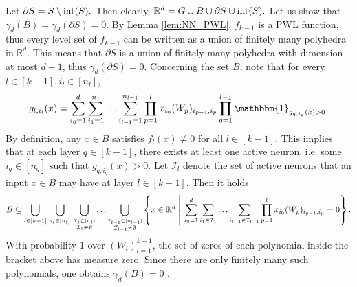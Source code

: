 \documentclass[11pt]{article}
\makeatletter
\def\RR{\mathbb{R}}
\def\Set#1{\left\{ #1 \right\}}
\def\Bigbar#1{\mathrel{\left|\vphantom{#1}\right.}}%
\def\Setbar#1#2{\Set{#1 \Bigbar{#1 #2} #2}}
\def\interior{\mathop{\rm int}\nolimits}
\makeatother
\begin{document}
    Let $\partial S=S\setminus\interior(S).$ 
    Then clearly, $\RR^d=G\cup B\cup\partial S\cup\interior(S).$
    Let us show that $\gamma_d(B)=\gamma_d(\partial S)=0.$
    By Lemma \ref{lem:NN_PWL}, $f_{k-1}$ is a PWL function,
    thus every level set of $f_{k-1}$ can be written as a union of finitely many polyhedra in $\RR^d.$
    This means that $\partial S$ is a union of finitely many polyhedra with dimension at most $d-1$, thus $\gamma_d(\partial S)=0.$
    Concerning the set $B$, note that for every $l\in[k-1], i_l\in[n_l]$,
    \begin{align*}
	g_{l,i_l}(x)
	=\sum_{i_0=1}^{d} \sum_{i_1=1}^{n_1}\ldots\sum_{i_{l-1}=1}^{n_{l-1}} \prod_{p=1}^{l} x_{i_0} (W_p)_{i_{p-1},i_p} \prod_{q=1}^{l-1} \mathbbm{1}_{g_{q,i_q}(x)>0} .
    \end{align*}
    By definition, any $x\in B$ satisfies $f_l(x)\neq 0$ for all $l\in[k-1]$.
    This implies that at each layer $q\in[k-1]$, there exists at least one active neuron, i.e. some $i_q\in[n_q]$ such that $g_{q,i_q}(x)>0$.
    Let $\mathcal{I}_l$ denote the set of active neurons that an input $x\in B$ may have at layer $l\in[k-1].$
    Then it holds
    \begin{align*}
	B\subseteq
	\bigcup_{l\in[k-1]}\;
	\bigcup_{i_l\in[n_l]}\;
	\bigcup_{\stackrel{\mathcal{I}_1\subseteq [n_1]}{\mathcal{I}_1\neq\emptyset}}
	\ldots
	\bigcup_{\stackrel{\mathcal{I}_{l-1}\subseteq [n_{l-1}]}{\mathcal{I}_{l-1}\neq\emptyset}}
	\Setbar{x\in\RR^d}{\sum_{i_0=1}^{d} \sum_{i_1\in\mathcal{I}_1}\ldots\sum_{i_{l-1}\in\mathcal{I}_{l-1}} \prod_{p=1}^{l} x_{i_0} (W_p)_{i_{p-1},i_p} = 0} .
    \end{align*}
    With probability 1 over $(W_l)_{l=1}^{k-1}$, the set of zeros of each polynomial inside the bracket above has measure zero.
    Since there are only finitely many such polynomials, one obtains $\gamma_d(B)=0$ .
    
\end{document}
